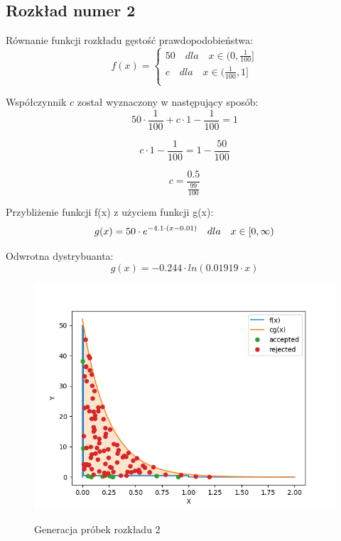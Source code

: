 \documentclass[12pt,a4paper]{article}
\begin{document}
  \subsection{Rozkład numer 2}
      
  Równanie funkcji rozkładu gęstość prawdopodobieństwa:
  \begin{equation}
    f(x) = \begin{cases}
        50 \quad dla \quad x  \in (0, \frac{1}{100}]\\
        c \quad dla \quad x  \in (\frac{1}{100}, 1]\\
      \end{cases}   
  \end{equation}

  Współczynnik $c$ został wyznaczony w następujący sposób:
  \begin{equation}
    50 \cdot \frac{1}{100} + c \cdot 1 - \frac{1}{100} = 1
  \end{equation}

  \begin{equation}
    c \cdot 1 - \frac{1}{100} = 1 - \frac{50}{100}
  \end{equation}

  \begin{equation}
    c = \frac{0.5}{\frac{99}{100}}
  \end{equation}
  

  Przybliżenie funkcji f(x) z użyciem funkcji g(x):
  \begin{equation}
    g(x) = 50 \cdot e^{-4.1 \cdot (x-0.01)}  \quad dla \quad x  \in [0, \infty) \\
  \end{equation}

  Odwrotna dystrybuanta:
  \begin{equation}
    g(x) = -0.244 \cdot ln(0.01919 \cdot x)
  \end{equation}

  \begin{figure}[H]
    \centering
    \includegraphics[height=0.4\textheight]{figures/Figure_25.png}
    \label{fig:25}
    \caption{Generacja próbek rozkładu 2}
  \end{figure}
\end{document}
